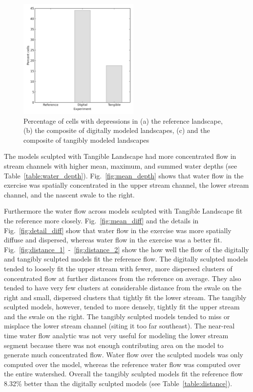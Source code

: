 \documentclass{isprs}
\begin{document}
\begin{figure}[ht!]
\begin{center}
\includegraphics[width=225px]{figures/depression_cells.png}
\caption{Percentage of cells with depressions in (a) the reference landscape, (b) the composite of digitally modeled landscapes, (c) and the composite of tangibly modeled landscapes}
\label{fig:depression_plot}
\end{center}
\end{figure}

The models sculpted with Tangible Landscape 
had more concentrated flow in stream channels
with higher 
mean, maximum, and 
summed water depths
(see Table~\ref{table:water_depth}).
%
Fig.~\ref{fig:mean_depth}
shows that water flow in the  exercise was
spatially concentrated 
in the upper stream channel, 
the lower stream channel, 
and the nascent swale to the right.

Furthermore the water flow across models sculpted with Tangible Landscape fit the reference more closely.
Fig.~\ref{fig:mean_diff} and the details in Fig.~\ref{fig:detail_diff} 
show that water flow in the  exercise was more spatially diffuse and dispersed, 
whereas water flow in the  exercise was a better fit. %
%
Fig.~\ref{fig:distance_1}~-~\ref{fig:distance_2} 
show the how well the flow of the digitally and tangibly sculpted models fit the reference flow. 
%
The digitally sculpted models tended to loosely fit the upper stream with fewer, more dispersed clusters of concentrated flow at further distances from the reference on average. They also tended to have very few clusters at considerable distance from the swale on the right and small, dispersed clusters that tightly fit the lower stream. 
%
The tangibly sculpted models, however, tended to more densely, tightly fit the upper stream and the swale on the right. 
The tangibly sculpted models tended to miss or misplace the lower stream channel (siting it too far southeast). 
The near-real time water flow analytic was not very useful for modeling the lower stream segment because there was not enough contributing area on the model to generate much concentrated flow. 
Water flow over the sculpted models was only computed over the model, 
whereas the reference water flow was computed over the entire watershed. 
%
Overall the tangibly sculpted models fit the reference flow 8.32\% better than the digitally sculpted models (see Table~\ref{table:distance}).
\end{document}
